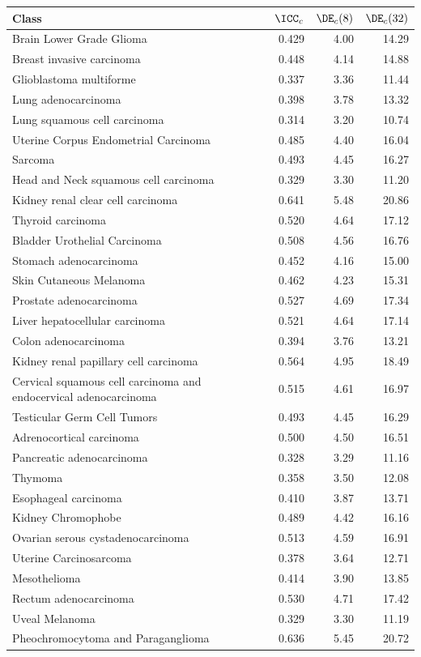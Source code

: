 \begin{tabular}{@{}p{9cm}rrr@{}}
\toprule
Class & $\ICC_c$ & $\DE_c(8)$ & $\DE_c(32)$ \\
\midrule
Brain Lower Grade Glioma & 0.429 & 4.00 & 14.29 \\
Breast invasive carcinoma & 0.448 & 4.14 & 14.88 \\
Glioblastoma multiforme & 0.337 & 3.36 & 11.44 \\
Lung adenocarcinoma & 0.398 & 3.78 & 13.32 \\
Lung squamous cell carcinoma & 0.314 & 3.20 & 10.74 \\
Uterine Corpus Endometrial Carcinoma & 0.485 & 4.40 & 16.04 \\
Sarcoma & 0.493 & 4.45 & 16.27 \\
Head and Neck squamous cell carcinoma & 0.329 & 3.30 & 11.20 \\
Kidney renal clear cell carcinoma & 0.641 & 5.48 & 20.86 \\
Thyroid carcinoma & 0.520 & 4.64 & 17.12 \\
Bladder Urothelial Carcinoma & 0.508 & 4.56 & 16.76 \\
Stomach adenocarcinoma & 0.452 & 4.16 & 15.00 \\
Skin Cutaneous Melanoma & 0.462 & 4.23 & 15.31 \\
Prostate adenocarcinoma & 0.527 & 4.69 & 17.34 \\
Liver hepatocellular carcinoma & 0.521 & 4.64 & 17.14 \\
Colon adenocarcinoma & 0.394 & 3.76 & 13.21 \\
Kidney renal papillary cell carcinoma & 0.564 & 4.95 & 18.49 \\
Cervical squamous cell carcinoma and endocervical adenocarcinoma & 0.515 & 4.61 & 16.97 \\
Testicular Germ Cell Tumors & 0.493 & 4.45 & 16.29 \\
Adrenocortical carcinoma & 0.500 & 4.50 & 16.51 \\
Pancreatic adenocarcinoma & 0.328 & 3.29 & 11.16 \\
Thymoma & 0.358 & 3.50 & 12.08 \\
Esophageal carcinoma & 0.410 & 3.87 & 13.71 \\
Kidney Chromophobe & 0.489 & 4.42 & 16.16 \\
Ovarian serous cystadenocarcinoma & 0.513 & 4.59 & 16.91 \\
Uterine Carcinosarcoma & 0.378 & 3.64 & 12.71 \\
Mesothelioma & 0.414 & 3.90 & 13.85 \\
Rectum adenocarcinoma & 0.530 & 4.71 & 17.42 \\
Uveal Melanoma & 0.329 & 3.30 & 11.19 \\
Pheochromocytoma and Paraganglioma & 0.636 & 5.45 & 20.72 \\
\bottomrule
\end{tabular}
